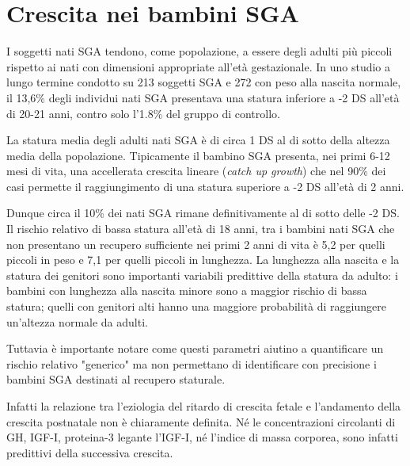 \section{Crescita nei bambini SGA}

I soggetti nati SGA tendono, come popolazione, a essere degli adulti più piccoli
rispetto ai nati con dimensioni appropriate all'età gestazionale. In uno studio
a lungo termine condotto su 213 soggetti SGA e 272 con peso alla nascita normale, il 
13,6\% degli individui nati SGA presentava una statura inferiore a -2 DS all'età di
20-21 anni, contro solo l'1.8\% del gruppo di controllo.\cite{leger1997reduced}

La statura media degli adulti nati SGA è di circa 1 DS al di sotto della altezza 
media della popolazione. Tipicamente il bambino SGA presenta, nei primi 6-12 mesi
di vita, una accellerata crescita lineare (\textit{catch up growth}) che nel 90\%
dei casi permette il raggiungimento di una statura superiore a -2 DS all'età di
2 anni.

Dunque circa il 10\% dei nati SGA rimane definitivamente al di sotto delle -2 DS.
Il rischio relativo di bassa statura all'età di 18 anni, tra i bambini nati SGA
che non presentano un recupero sufficiente nei primi 2 anni di vita è 5,2 per quelli 
piccoli in peso e 7,1 per quelli piccoli in lunghezza.
La lunghezza alla nascita e la statura dei genitori sono importanti variabili predittive della statura da 
adulto: i bambini con lunghezza alla nascita minore sono a maggior rischio di bassa statura;
quelli con genitori alti hanno una maggiore probabilità di raggiungere
un'altezza normale da adulti.\cite{cianfarani2006hormonal}

Tuttavia è importante notare come questi parametri aiutino a quantificare un 
rischio relativo "generico" ma non permettano di identificare con precisione 
i bambini SGA destinati al recupero staturale.

Infatti la relazione tra l'eziologia del ritardo di crescita fetale e l'andamento della 
crescita postnatale non è chiaramente definita.
Né le concentrazioni circolanti di GH, IGF-I, proteina-3 legante l'IGF-I, n\'e l'indice
di massa corporea, sono infatti predittivi della successiva crescita.\cite{consensus}



